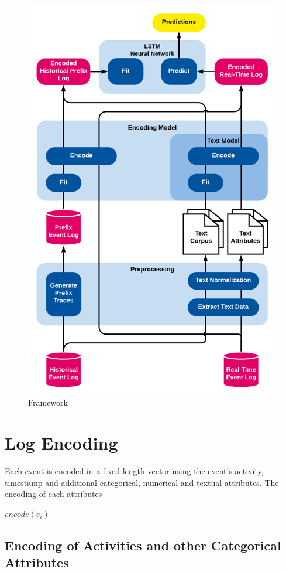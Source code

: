 \begin{figure}
	\includegraphics[width=\textwidth]{figures/framework}
	\caption{Framework}
	\label{fig:framework}
\end{figure}


\section{Log Encoding}

Each event is encoded in a fixed-length vector using the event's activity, timestamp and additional categorical, numerical and textual attributes.
The encoding of each attributes 

$ encode(e_i)$
\subsection{Encoding of Activities and other Categorical Attributes}



